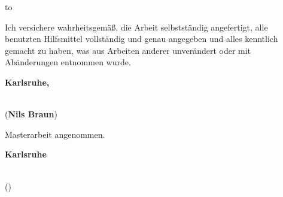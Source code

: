 \vspace*{32\baselineskip}
\hbox to \textwidth{\hrulefill}
\par
Ich versichere wahrheitsgemäß, die Arbeit selbstständig angefertigt, alle benutzten Hilfsmittel vollständig und genau angegeben und alles kenntlich gemacht zu haben, was aus Arbeiten anderer unverändert oder mit Abänderungen entnommen wurde.

\textbf{Karlsruhe, \submissiontime}
\vspace{1.5cm}

\dotfill\hspace*{8.0cm}\\
\hspace*{2cm}(\textbf{Nils Braun}) %


\thispagestyle{empty}

\clearpage

\vspace*{35\baselineskip}
Masterarbeit angenommen.

\textbf{Karlsruhe}
\vspace{1.5cm}

\dotfill\hspace*{8.0cm}\\
\hspace*{1cm}(\textbf{\reviewerone}) %


\thispagestyle{empty}
\cleardoublepage
